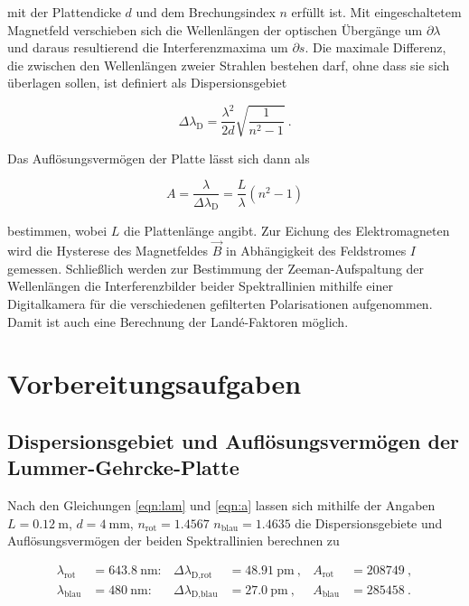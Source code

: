 mit der Plattendicke $d$ und dem Brechungsindex $n$ erfüllt ist.
Mit eingeschaltetem Magnetfeld verschieben sich die Wellenlängen der 
optischen Übergänge um $\partial \lambda$ und daraus resultierend
die Interferenzmaxima um $\partial s$.
Die maximale Differenz, die zwischen den Wellenlängen zweier Strahlen bestehen darf,
ohne dass sie sich überlagen sollen, ist definiert als Dispersionsgebiet

\vspace{-20pt}
\begin{equation}
    \Delta \lambda_\text{D} = \frac{\lambda^2}{2d} \sqrt{\frac{1}{n^2-1}}\: .
    \label{eqn:lam}
\end{equation}

Das Auflösungsvermögen der Platte lässt sich dann als

\vspace{-5pt}
\begin{equation}
    A = \frac{\lambda}{\Delta \lambda_\text{D}} = \frac{L}{\lambda} (n^2 -1)
    \label{eqn:a}
\end{equation}

bestimmen, wobei $L$ die Plattenlänge angibt.
Zur Eichung des Elektromagneten wird die Hysterese des Magnetfeldes $\vec{B}$ in Abhängigkeit
des Feldstromes $I$ gemessen. Schließlich werden zur Bestimmung der Zeeman-Aufspaltung der
Wellenlängen die Interferenzbilder beider Spektrallinien mithilfe einer Digitalkamera
für die verschiedenen gefilterten Polarisationen aufgenommen. Damit ist auch 
eine Berechnung der Landé-Faktoren möglich.

\section{Vorbereitungsaufgaben}

\subsection{Dispersionsgebiet und Auflösungsvermögen der Lummer-Gehrcke-Platte}

Nach den Gleichungen \eqref{eqn:lam} und \eqref{eqn:a} lassen sich mithilfe
der Angaben $L = \SI{0.12}{\meter}$, $d = \SI{4}{\milli\meter}$, $n_\text{rot} = \num{1.4567}$
$n_\text{blau} = \num{1.4635}$ die Dispersionsgebiete und Auflösungsvermögen der beiden 
Spektrallinien berechnen zu

\vspace{-15pt}
\begin{align*}
    \lambda_\text{rot} &= \SI{643.8}{\nano\meter}: & \Delta \lambda_\text{D,rot} &= \SI{48.91}{\pico\meter}\:, & A_\text{rot} &= \num{208749}\:, \\
    \lambda_\text{blau} &= \SI{480}{\nano\meter}: & \Delta \lambda_\text{D,blau} &= \SI{27.0}{\pico\meter}\:, & A_\text{blau} &= \num{285458}\:. 
\end{align*}


